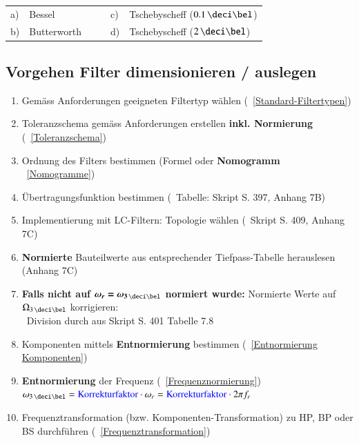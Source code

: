 \begin{tabular}{ll cc ll}
    a) & Bessel         & & & c) & Tschebyscheff ($0.1 \, \deci \bel$) \\
    b) & Butterworth    & & & d) & Tschebyscheff ($2 \, \deci \bel$) \\
\end{tabular}


\subsection{Vorgehen Filter dimensionieren / auslegen}

\begin{enumerate}
    \item Gemäss Anforderungen geeigneten Filtertyp wählen (\textrightarrow\ \ref{Standard-Filtertypen})
    \item Toleranzschema gemäss Anforderungen erstellen \textbf{inkl. Normierung} (\textrightarrow\ \ref{Toleranzschema})
    \item Ordnung des Filters bestimmen (Formel oder \textbf{Nomogramm} \textrightarrow\ \ref{Nomogramme})
    \item Übertragungsfunktion bestimmen (\textrightarrow\ Tabelle: Skript S. 397, Anhang 7B)
    \item Implementierung mit LC-Filtern: Topologie wählen (\textrightarrow\ Skript S. 409, Anhang 7C)
    \item \textbf{Normierte} Bauteilwerte aus entsprechender Tiefpass-Tabelle herauslesen (Anhang 7C)
    \item \textbf{Falls nicht auf $\bm{\omega_r = \omega_{3 \, \deci \bel}}$ normiert wurde:} Normierte Werte auf $\Omega_{3 \, \deci \bel}$ korrigieren: \\
         \textrightarrow\ Division durch  aus Skript S. 401 Tabelle 7.8
    \item Komponenten mittels \textbf{Entnormierung} bestimmen (\textrightarrow\ \ref{Entnormierung Komponenten})
    \item \textbf{Entnormierung} der Frequenz (\textrightarrow\ \ref{Frequenznormierung})\\
        $\omega_{3 \, \deci \bel} = \text{\cbl{Korrekturfaktor}} \cdot \omega_r = \text{\cbl{Korrekturfaktor}} \cdot 2 \pi f_r $
    \item Frequenztransformation (bzw. Komponenten-Transformation) zu HP, BP oder BS durchführen (\textrightarrow\ \ref{Frequenztransformation})
\end{enumerate}


